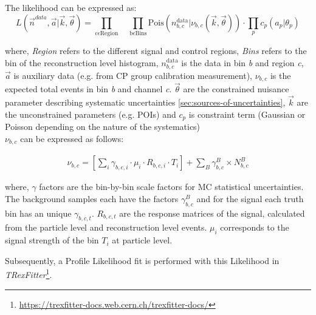 The likelihood can be expressed as:
\begin{equation}\label{eq:likelihodd-defn}
	L(\vec{n}^{data},\vec{a} | \vec{k}, \vec{\theta}) = \prod_{\mathrm{c} \epsilon \mathrm{Region}} \quad \prod_{\mathrm{b} \epsilon \mathrm{Bins}} \mathrm{Pois} (n^{\mathrm{data}}_{b,c}|\nu_{b,c}(\vec{k}, \Vec{\theta})) \cdot \prod_{p} c_p(a_p|\theta_{p})
\end{equation}

where, \textit{Region} refers to the different signal and control regions, \textit{Bins} refers to the bin of the reconstruction level 
histogram, $n^{\mathrm{data}}_{b,c}$ is the data in bin \textit{b} and  region \textit{c}, $\vec{a}$ is auxiliary data (e.g. from CP group calibration measurement), $\nu_{b,c}$ is the expected total events in bin \textit{b} and channel \textit{c}. $\Vec{\theta}$ are the constrained nuisance parameter describing systematic uncertainties \cref{sec:sources-of-uncertainties}, $\vec{k}$ are the unconstrained parameters (e.g. POIs) and $c_p$ is constraint term (Gaussian or Poisson depending on the nature of the systematics)\\

$\nu_{b,c}$ can be expressed as follows:

\begin{align}\label{eq:likelihodd-defn-1}
    \nu_{b,c} = \left[\sum_i \gamma_{b,c,i} \cdot \mu_{i} \cdot R_{b,c,i} \cdot T_{i}\right] + \sum_{B} \gamma_{b,c}^{B} \times N_{b,c}^{B} 
\end{align}

where, $\gamma$ factors are the bin-by-bin scale factors for MC statistical uncertainties. The background samples each have the factors $\gamma_{b,c}^{B}$ and for the signal each truth bin has an unique $\gamma_{b,c,t}$. $R_{b,c,t}$ are the response matrices of the signal, calculated from the particle level and reconstruction level events. $\mu_{i}$ corresponds to the signal strength of the bin $T_{i}$ at particle level.

Subsequently, a Profile Likelihood fit is performed with this Likelihood in \emph{TRexFitter}\footnote{\url{https://trexfitter-docs.web.cern.ch/trexfitter-docs/}}.


